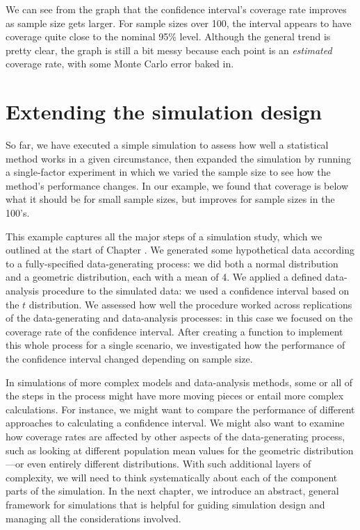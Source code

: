 \documentclass[
]{book}
\begin{document}
We can see from the graph that the confidence interval's coverage rate improves as sample size gets larger. For sample sizes over 100, the interval appears to have coverage quite close to the nominal 95\% level.
Although the general trend is pretty clear, the graph is still a bit messy because each point is an \emph{estimated} coverage rate, with some Monte Carlo error baked in.

\section{Extending the simulation design}\label{extending-the-simulation-design}

So far, we have executed a simple simulation to assess how well a statistical method works in a given circumstance, then expanded the simulation by running a single-factor experiment in which we varied the sample size to see how the method's performance changes.
In our example, we found that coverage is below what it should be for small sample sizes, but improves for sample sizes in the 100's.

This example captures all the major steps of a simulation study, which we outlined at the start of Chapter \citep{introduction}.
We generated some hypothetical data according to a fully-specified data-generating process: we did both a normal distribution and a geometric distribution, each with a mean of 4.
We applied a defined data-analysis procedure to the simulated data: we used a confidence interval based on the \(t\) distribution.
We assessed how well the procedure worked across replications of the data-generating and data-analysis processes: in this case we focused on the coverage rate of the confidence interval.
After creating a function to implement this whole process for a single scenario, we investigated how the performance of the confidence interval changed depending on sample size.

In simulations of more complex models and data-analysis methods, some or all of the steps in the process might have more moving pieces or entail more complex calculations.
For instance, we might want to compare the performance of different approaches to calculating a confidence interval.
We might also want to examine how coverage rates are affected by other aspects of the data-generating process, such as looking at different population mean values for the geometric distribution---or even entirely different distributions.
With such additional layers of complexity, we will need to think systematically about each of the component parts of the simulation.
In the next chapter, we introduce an abstract, general framework for simulations that is helpful for guiding simulation design and managing all the considerations involved.
\end{document}
